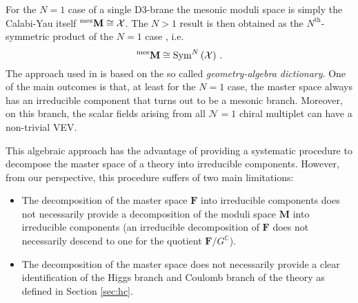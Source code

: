 \documentclass[main.tex]{subfiles}
\begin{document}
For the $N=1$ case of a single D$3$-brane the mesonic moduli space is simply the Calabi-Yau itself ${}^{\textrm{mes}}\mathbf{M}\cong\mathcal{X}$. The $N>1$ result is then obtained as the $N^{\text{th}}$-symmetric product of the $N=1$ case \cite{Berenstein:2002ge}, i.e.
\begin{equation}\label{eqn:symprod}
{}^{\textrm{mes}}\mathbf{M}\cong\operatorname{Sym}^N\left(\mathcal{X}\right)\,.
\end{equation}
The approach used in \cite{Forcella:2008bb} is based on the so called \textit{geometry-algebra dictionary}. One of the main outcomes is that, at least for the $N=1$ case, the master space always has an irreducible component that turns out to be a mesonic branch. %
Moreover, on this branch, the scalar fields arising from all $\mathcal{N}=1$ chiral multiplet can have a non-trivial VEV. 


This algebraic approach has the advantage of providing a systematic procedure to decompose the master space of a theory into irreducible components. However, from our perspective, this procedure suffers of two main limitations:
\begin{itemize}
\item The decomposition of the master space $\mathbf{F}$ into irreducible components does not necessarily provide a decomposition of the moduli space $\mathbf{M}$ into irreducible components (an irreducible decomposition of $\mathbf{F}$ does not necessarily descend to one for the quotient $\mathbf{F}/G^{\mathbb{C}}$).
\item  The decomposition of the master space does not necessarily provide a clear identification of the Higgs branch and Coulomb branch of the theory as defined in Section \ref{sec:hc}.
\end{itemize} 
\end{document}
